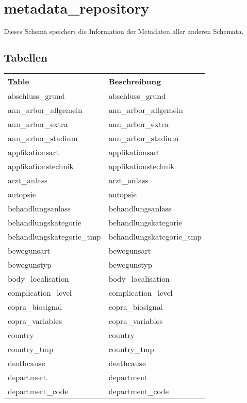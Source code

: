   \section{metadata\_repository}
  Dieses Schema speichert die Information der Metadaten aller anderen Schemata.
  
  \subsection{Tabellen}
  
  \begin{longtable}{||l|l||}
  	\hline Table & Beschreibung\\ \hline \hline
  	abschluss\_grund & abschluss\_grund\\ \hline
  	ann\_arbor\_allgemein & ann\_arbor\_allgemein\\ \hline
  	ann\_arbor\_extra & ann\_arbor\_extra\\ \hline
  	ann\_arbor\_stadium & ann\_arbor\_stadium\\ \hline
  	applikationsart & applikationsart\\ \hline
  	applikationstechnik & applikationstechnik\\ \hline
  	arzt\_anlass & arzt\_anlass\\ \hline
  	autopsie & autopsie\\ \hline
  	behandlungsanlass & behandlungsanlass\\ \hline
  	behandlungskategorie & behandlungskategorie\\ \hline
  	behandlungskategorie\_tmp & behandlungskategorie\_tmp\\ \hline
  	bewegunsart & bewegunsart\\ \hline
  	bewegunstyp & bewegunstyp\\ \hline
  	body\_localisation & body\_localisation\\ \hline
  	complication\_level & complication\_level\\ \hline
  	copra\_biosignal & copra\_biosignal\\ \hline
  	copra\_variables & copra\_variables\\ \hline
  	country & country\\ \hline
  	country\_tmp & country\_tmp\\ \hline
  	deathcause & deathcause\\ \hline
  	department & department\\ \hline
  	department\_code & department\_code\\ \hline

\end{longtable}
